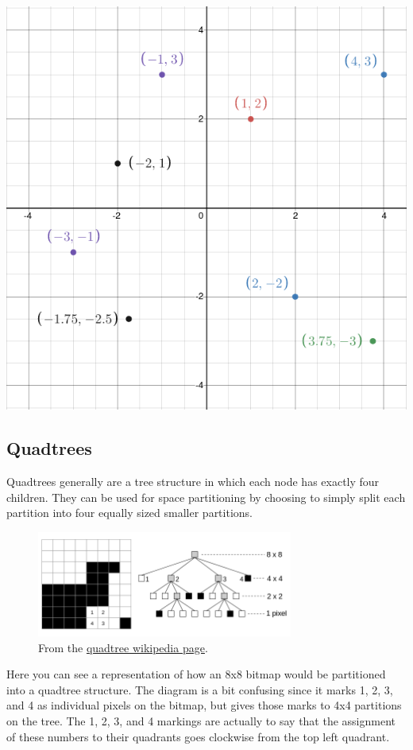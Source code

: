 \documentclass{article}
\begin{document}
\begin{center}
  \includegraphics[width=.75\textwidth]{desmos-graph}
\end{center}

\subsection{Quadtrees}
Quadtrees generally are a tree structure in which each node has exactly four children. They can be used for space
partitioning by choosing to simply split each partition into four equally sized smaller partitions.

\begin{figure}[h]
  \centering
  \includegraphics[width=0.75\textwidth]{quadtree.png}
  \caption{From the \href{https://en.wikipedia.org/wiki/Quadtree}{quadtree wikipedia page}.}
\end{figure}

Here you can see a representation of how an 8x8 bitmap would be partitioned into a quadtree structure.
The diagram is a bit confusing since it marks 1, 2, 3, and 4 as individual pixels on the bitmap, but gives those marks to 4x4 partitions on the tree.
The 1, 2, 3, and 4 markings are actually to say that the assignment of these numbers to their quadrants goes clockwise from the top left quadrant.
\end{document}
